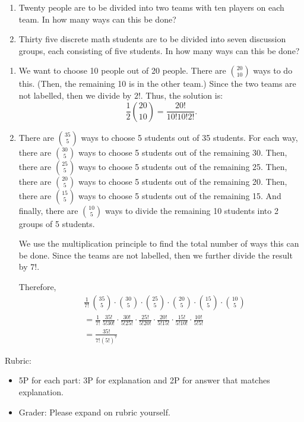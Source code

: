 \documentclass{article}
\theoremstyle{definition}
\begin{document}
\begin{question}
    \begin{enumerate}
	\item Twenty people are to be divided into two teams with ten players on each team.  
	In how many ways can this be done?
        \item Thirty five discrete math students are to be divided into seven discussion groups, each consisting of five students.  
        In how many ways can this be done?
   	\end{enumerate}
\end{question}
\begin{solution}
    	\begin{enumerate}


	
	\item We want to choose 10 people out of 20 people.  There are $\binom{20}{10}$ ways to do this.  (Then, the remaining 10 is in the other team.) 
        Since the two teams are not labelled, then we divide by $2!$.  Thus, the solution is:
        \[ \frac{1}{2} \binom{20}{10} = \frac{20!}{10!10!2!}. \]
        \item There are $\binom{35}{5}$ ways to choose 5 students out of 35 students.  For each way, there are $\binom{30}{5}$ ways to choose 5 students out of the remaining 30.  Then, there are $\binom{25}{5}$ ways to choose 5 students out of the remaining 25. Then, there are $\binom{20}{5}$ ways to choose 5 students out of the remaining 20. Then, there are $\binom{15}{5}$ ways to choose 5 students out of the remaining 15.  And finally, there are $\binom{10}{5}$ ways to divide the remaining 10 students into 2 groups of 5 students.  

We use the multiplication principle to find the total number of ways this can be done.  Since the teams are not labelled, then we further divide the result by $7!$.

Therefore,
\begin{align*}
    &\frac{1}{7!} \,\binom{35}{5} \cdot \binom{30}{5} \cdot \binom{25}{5 } \cdot \binom{20}{5} \cdot \binom{15}{5 } \cdot \binom{10}{5} \\
    &= 
    \frac{1}{7!} \, \frac{35!}{5!30!} \cdot \frac{30!}{5!25!} \cdot \frac{25!}{5!20!} \cdot \frac{20!}{5!15!} \cdot \frac{15!}{5!10!} \cdot \frac{10!}{5!5!}\\
   & = \frac{35!}{7!(5!)^7}
\end{align*}

        
   	\end{enumerate}
 {\color{red} Rubric:
\begin{itemize}
\item 5P for each part: 3P for explanation and 2P for answer that matches explanation.
\item Grader: Please expand on rubric yourself.
\end{itemize}}
\end{solution}
\end{document}
